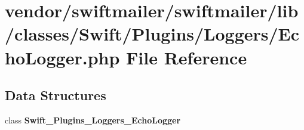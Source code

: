 \section{vendor/swiftmailer/swiftmailer/lib/classes/\+Swift/\+Plugins/\+Loggers/\+Echo\+Logger.php File Reference}
\label{_echo_logger_8php}
\subsection*{Data Structures}
\begin{DoxyCompactItemize}
\item 
class {\bf Swift\+\_\+\+Plugins\+\_\+\+Loggers\+\_\+\+Echo\+Logger}
\end{DoxyCompactItemize}
